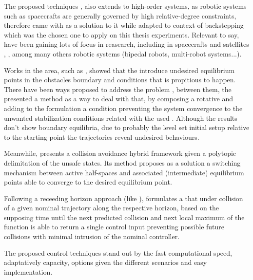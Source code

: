 The proposed techniques , also extends to high-order systems, as robotic systems such as spacecrafts are generally governed by high relative-degree constraints, therefore \cite{ames2019control} came with  as a solution to it while \cite{taylor2022safe} adapted to context of  backstepping~\cite{sepulchre2012constructive} which was the chosen one to apply on this thesis experiments.
Relevant to say,  have been gaining lots of focus in reasearch, including in spacecrafts and satellites \cite{breeden2022predictive, breeden2021guaranteed},  \cite{singletary2021comparative}, among many others robotic systems \cite{ames2019control} (bipedal robots, multi-robot systems...). 

Works in the area, such as \cite{reis2020control}, showed that the  \cite{ames2019control} introduce undesired equilibrium points in the obstacles boundary and conditions that is propitious to happen. There have been ways proposed to address the problem \cite{braun2020comment, cortez2022compatibility}, between them, the \cite{reis2020control} presented a method as a way to deal with that, by composing a rotative  and adding to the  formulation a  condition preventing the system convergence to the unwanted stabilization conditions related with the used . Although the results don't show boundary equilibria, due to probably the  level set initial setup relative to the starting point the trajectories reveal undesired behaviours.

Meanwhile, \cite{matias2025hybrid} presents a collision avoidance hybrid  framework given a polytopic delimitation of the unsafe states. Its method proposes as a solution a switching mechanism between active half-spaces and associated (intermediate) equilibrium points able to converge to the desired equilibrium point.

Following a receeding horizon approach (like ), \cite{breeden2022predictive} formulates a  that under collision of a given nominal trajectory along the respective horizon, based on the supposing time until the next predicted collision and next local maximum of the  function is able to return a single control input preventing possible future collisions with minimal intrusion of the nominal controller.  

The proposed control techniques stand out by the fast computational speed, adaptatively capacity, options given the different scenarios and easy implementation. 


